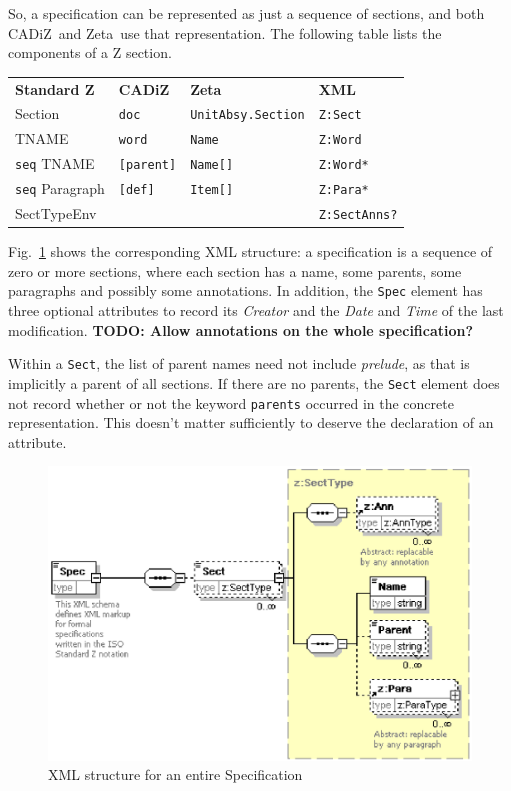 \documentclass{llncs}  %
\newcommand{\AFont}[1]{\texttt{#1}}
\newcommand{\CADiZ}{CADiZ}
\newcommand{\Zeta}{Zeta}
\newcommand{\ASection}{Section}
\newcommand{\AParagraph}{Paragraph}
\newcommand{\TNAME}{TNAME}
\newcommand{\ASectTypeEnv}{SectTypeEnv}
\newcommand{\TODO}[1]{\textbf{TODO: #1}}   %
\begin{document}
So, a specification can be represented as just a sequence of sections,
and both \CADiZ\ and \Zeta\ use that representation.
The following table lists the components of a Z section.
\begin{center}
\begin{tabular}{|l|l|l|l|}
\hline
{\bf Standard Z} & {\bf \CADiZ} & {\bf \Zeta} & {\bf XML}\\
\ASection & \AFont{doc} & \AFont{UnitAbsy.Section} & \AFont{Z:Sect}\\
\hline
\TNAME & \AFont{word} & \AFont{Name} & \AFont{Z:Word}\\
\AFont{seq} \TNAME & \AFont{[parent]} & \AFont{Name[]} & \AFont{Z:Word*}\\
\AFont{seq} \AParagraph & \AFont{[def]} & \AFont{Item[]} & \AFont{Z:Para*}\\
\ASectTypeEnv & & & \AFont{Z:SectAnns?}\\
\hline
\end{tabular}
\end{center}

Fig.~\ref{fig:spec}
shows the corresponding XML structure: a specification is a sequence of
zero or more sections, where each section has a name, some parents, 
some paragraphs and possibly some annotations.  In addition, the
\AFont{Spec} element has three optional attributes to record its
\emph{Creator} and the \emph{Date} and \emph{Time} of the last
modification. 
\TODO{Allow annotations on the whole specification?}

Within a \AFont{Sect}, the list of parent names need not include
\textit{prelude}, as that is implicitly a parent of all sections.
If there are no parents,
the \AFont{Sect} element does not record whether or not
the keyword \AFont{parents} occurred in the concrete representation.
This doesn't matter sufficiently to deserve the declaration of an attribute.

\begin{figure}[htbp]
  \centering
  \includegraphics[width=\textwidth]{spec.eps}
  \caption{XML structure for an entire Specification}
  \label{fig:spec}
\end{figure}
\end{document}
